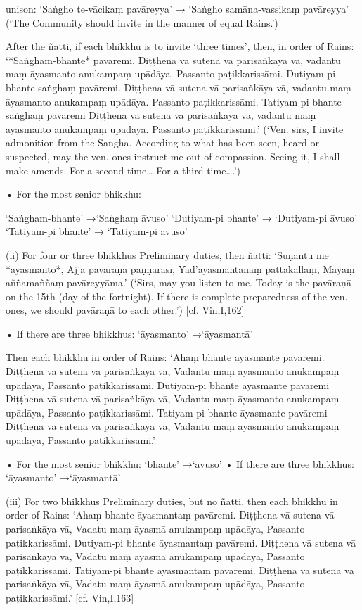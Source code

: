 unison:
‘Saṅgho te-vācikaṃ pavāreyya’
→ ‘Saṅgho samāna-vassikaṃ pavāreyya’
(‘The Community should invite
in the manner of equal Rains.’)

After the ñatti, if each bhikkhu is to invite
‘three times’, then, in order of Rains:
‘*Saṅgham-bhante* pavāremi.
Diṭṭhena vā sutena vā parisaṅkāya vā,
vadantu maṃ āyasmanto anukampaṃ upādāya.
Passanto paṭikkarissāmi.
Dutiyam-pi bhante saṅghaṃ pavāremi.
Diṭṭhena vā sutena vā parisaṅkāya vā,
vadantu maṃ āyasmanto anukampaṃ upādāya.
Passanto paṭikkarissāmi.
Tatiyam-pi bhante saṅghaṃ pavāremi
Diṭṭhena vā sutena vā parisaṅkāya vā,
vadantu maṃ āyasmanto anukampaṃ upādāya.
Passanto paṭikkarissāmi.’
(‘Ven. sirs, I invite admonition from the Sangha.
According to what has been seen, heard or suspected,
may the ven. ones instruct me out of compassion.
Seeing it, I shall make amends.
For a second time… For a third time….’)

• For the most senior bhikkhu:

‘Saṅgham-bhante’ →‘Saṅghaṃ āvuso’
‘Dutiyam-pi bhante’ → ‘Dutiyam-pi āvuso’
‘Tatiyam-pi bhante’ → ‘Tatiyam-pi āvuso’

(ii) For four or three bhikkhus
Preliminary duties, then ñatti:
‘Suṇantu me *āyasmanto*,
Ajja pavāraṇā paṇṇarasī,
Yad’āyasmantānaṃ pattakallaṃ,
Mayaṃ aññamaññaṃ pavāreyyāma.’
(‘Sirs, may you listen to me. Today is the pavāraṇā
on the 15th (day of the fortnight). If there is
complete preparedness of the ven. ones, we should
pavāraṇā to each other.’)
[cf. Vin,I,162]

• If there are three bhikkhus:
‘āyasmanto’ →‘āyasmantā’

Then each bhikkhu in order of Rains:
‘Ahaṃ bhante āyasmante pavāremi.
Diṭṭhena vā sutena vā parisaṅkāya vā,
Vadantu maṃ āyasmanto anukampaṃ upādāya,
Passanto paṭikkarissāmi.
Dutiyam-pi bhante āyasmante pavāremi
Diṭṭhena vā sutena vā parisaṅkāya vā,
Vadantu maṃ āyasmanto anukampaṃ upādāya,
Passanto paṭikkarissāmi.
Tatiyam-pi bhante āyasmante pavāremi
Diṭṭhena vā sutena vā parisaṅkāya vā,
Vadantu maṃ āyasmanto anukampaṃ upādāya,
Passanto paṭikkarissāmi.’

• For the most senior bhikkhu:
‘bhante’ →‘āvuso’
• If there are three bhikkhus:
‘āyasmanto’ →‘āyasmantā’

(iii) For two bhikkhus
Preliminary duties, but no ñatti, then each
bhikkhu in order of Rains:
‘Ahaṃ bhante āyasmantaṃ pavāremi.
Diṭṭhena vā sutena vā parisaṅkāya vā,
Vadatu maṃ āyasmā anukampaṃ upādāya,
Passanto paṭikkarissāmi.
Dutiyam-pi bhante āyasmantaṃ pavāremi.
Diṭṭhena vā sutena vā parisaṅkāya vā,
Vadatu maṃ āyasmā anukampaṃ upādāya,
Passanto paṭikkarissāmi.
Tatiyam-pi bhante āyasmantaṃ pavāremi.
Diṭṭhena vā sutena vā parisaṅkāya vā,
Vadatu maṃ āyasmā anukampaṃ upādāya,
Passanto paṭikkarissāmi.’
[cf. Vin,I,163]

